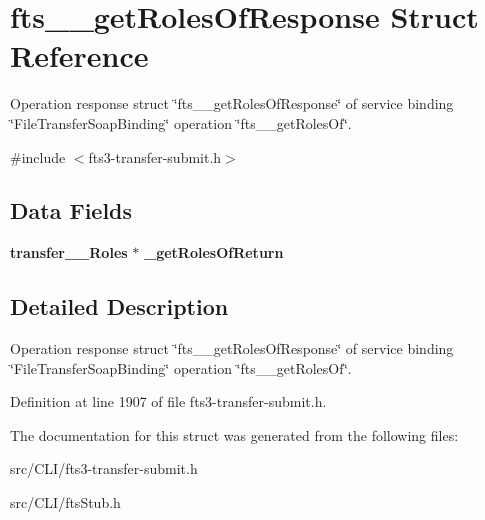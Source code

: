 \section{fts\_\-\_\-getRolesOfResponse Struct Reference}
\label{structfts____getRolesOfResponse}


Operation response struct \char`\"{}fts\_\-\_\-getRolesOfResponse\char`\"{} of service binding \char`\"{}FileTransferSoapBinding\char`\"{} operation \char`\"{}fts\_\-\_\-getRolesOf\char`\"{}.  




{\ttfamily \#include $<$fts3-\/transfer-\/submit.h$>$}

\subsection*{Data Fields}
\begin{DoxyCompactItemize}
\item 
{\bf transfer\_\-\_\-Roles} $\ast$ {\bfseries \_\-getRolesOfReturn}\label{structfts____getRolesOfResponse_aecebbd4a91ffed277488ade7da5f1d65}

\end{DoxyCompactItemize}


\subsection{Detailed Description}
Operation response struct \char`\"{}fts\_\-\_\-getRolesOfResponse\char`\"{} of service binding \char`\"{}FileTransferSoapBinding\char`\"{} operation \char`\"{}fts\_\-\_\-getRolesOf\char`\"{}. 

Definition at line 1907 of file fts3-\/transfer-\/submit.h.



The documentation for this struct was generated from the following files:\begin{DoxyCompactItemize}
\item 
src/CLI/fts3-\/transfer-\/submit.h\item 
src/CLI/ftsStub.h\end{DoxyCompactItemize}
